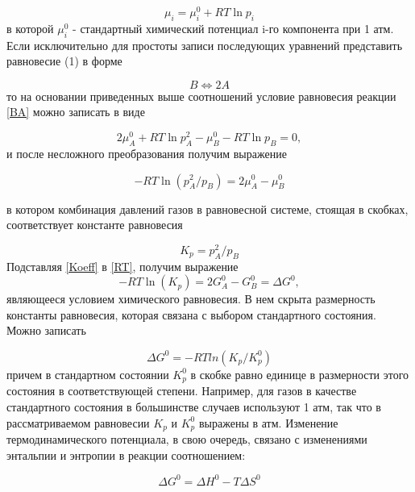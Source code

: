 \documentclass[a4paper,12pt]{article} %
\begin{document}
\begin{equation}
 \mu_i = \mu_i^0 + RT \ln{p_i}
\end{equation}
в которой \( \mu_i^0 \) - стандартный химический потенциал i-го компонента при 1 атм.
Если исключительно для простоты записи последующих уравнений представить равновесие (1) в форме

\begin{equation}\label{BA}
 B \Leftrightarrow 2A
\end{equation}
то на основании приведенных выше соотношений условие равновесия реакции \eqref{BA} можно записать в виде

\begin{equation}
 2 \mu_A^0 + RT \ln{p_A^2} - \mu_B^0 - RT \ln{p_B} = 0,
\end{equation}
и после несложного преобразования получим выражение

\begin{equation} \label{RT}
 -RT \ln(p_A^2 / p_B) = 2 \mu_A^0 - \mu_B^0
\end{equation}

в котором комбинация давлений газов в равновесной системе, стоящая в скобках, соответствует константе равновесия

\begin{equation} \label{Koeff}
 K_p = p_A^2 / p_B
\end{equation}
Подставляя \eqref{Koeff} в \eqref{RT}, получим выражение
\begin{equation}
 -RT \ln(K_p) =  2 G_A^0 - G_B^0 = \Delta G^0,
\end{equation}
являющееся условием химического равновесия. В нем скрыта размерность константы равновесия, которая связана с выбором стандартного состояния. Можно записать

\begin{equation}
 \Delta G^0 = -RT ln(K_p / K_p^0)
\end{equation}
причем в стандартном состоянии \(K_p^0\) в скобке равно единице в размерности этого состояния в соответствующей степени. Например, для газов в качестве стандартного состояния в большинстве случаев используют 1 атм, так что в рассматриваемом равновесии \(K_p\) и \(K_p^0\) выражены в атм.
Изменение термодинамического потенциала, в свою очередь, связано с изменениями энтальпии и энтропии в реакции соотношением:

\begin{equation}
 \Delta G^0 = \Delta H^0 - T \Delta S^0
\end{equation}
\end{document}
